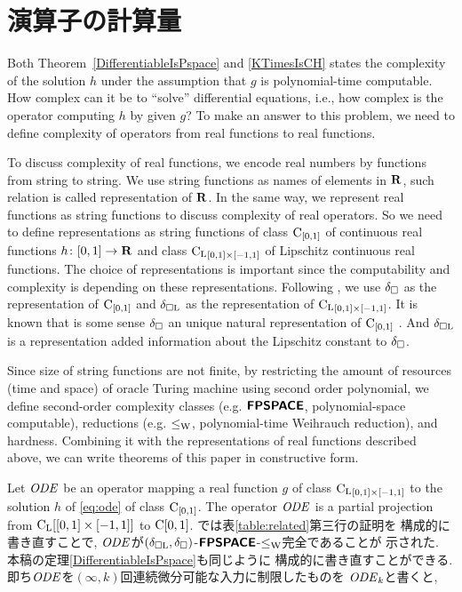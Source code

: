 \section{演算子の計算量}

Both Theorem~\ref{DifferentiableIsPspace} and \ref{KTimesIsCH}
states the complexity of the solution $h$ under the assumption 
that $g$ is polynomial-time computable.
How complex can it be to ``solve'' differential equations,
i.e., how complex is the operator computing $h$ by given $g$?
To make an answer to this problem,
we need to define complexity of operators from real functions to real functions.

To discuss complexity of real functions,
we encode real numbers by functions from string to string.
We use string functions as names of elements in $\mathbf R$,
such relation is called representation of $\mathbf R$.
In the same way, we represent real functions as string functions
to discuss complexity of real operators.
So we need to define representations as string functions of
class $\mathrm C_{[0, 1]}$ of continuous real functions $h \colon [0,1] \to \mathbf R$ 
and class ${\mathrm C _{\mathrm L}}_{[0, 1] \times [-1, 1]}$ of Lipschitz continuous real functions.
The choice of representations is important since the computability and complexity is depending on these representations.
Following \cite{kawamura2010operators},
we use $\delta _\square$ as the representation of $\mathrm C_{[0,1]}$ and $\delta _{\square \mathrm L}$ as the representation of ${\mathrm C _{\mathrm L}}_{[0, 1] \times [-1, 1]}$.
It is known that is some sense $\delta _\square$ an unique natural representation of $\mathrm C_{[0, 1]}$ \cite{kawamura11:_funct_space_repres_and_polyn_time_comput}.
And $\delta _{\square \mathrm L}$ is a representation
added information about the Lipschitz constant to $\delta _\square$.

Since size of string functions are not finite,
by restricting the amount of resources (time and space) of oracle Turing machine using second order polynomial,
we define second-order complexity classes
(e.g. $\text{\bfseries \sffamily \upshape FPSPACE}$, polynomial-space computable),
reductions (e.g. $\leq _{\mathrm W}$, polynomial-time Weihrauch reduction),
and hardness.
Combining it with the representations of real functions described above,
we can write theorems of this paper in constructive form.

Let $\mathit{ODE}$ be an operator mapping a real function $g$ of class ${\mathrm C _{\mathrm L}}_{[0, 1] \times [-1, 1]}$ to
the solution $h$ of \eqref{eq:ode} of class $\mathrm C_{[0, 1]}$.
The operator $\mathit{ODE}$ is a partial projection from ${\mathrm C _{\mathrm L}} [[0, 1] \times [-1, 1]]$ to $\mathrm C [0, 1]$.
\cite[定理4.9]{kawamura2010operators}では表\ref{table:related}第三行の証明を
構成的に書き直すことで, 
$\mathit{ODE}$が$(\delta _{\square \mathrm L}, \delta _\square)$-$\text{\bfseries \sffamily \upshape FPSPACE}$-$\leq _{\mathrm W}$完全であることが
示された. 
本稿の定理\ref{DifferentiableIsPspace}も同じように
構成的に書き直すことができる. 
即ち$\mathit{ODE}$を$(\infty, k)$回連続微分可能な入力に制限したものを
$\mathit{ODE} _k$と書くと, 

